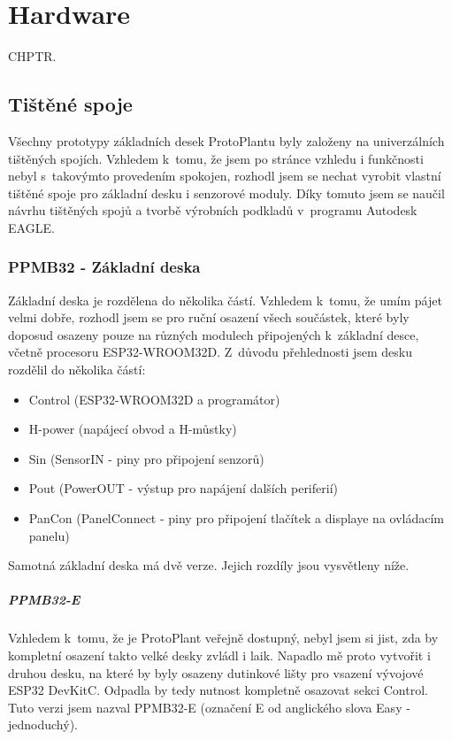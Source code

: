 \chapter{Hardware}
CHPTR.

\section{Tištěné spoje}
Všechny prototypy základních desek ProtoPlantu byly založeny na univerzálních tištěných spojích. Vzhledem k~tomu, že jsem po stránce vzhledu i funkčnosti nebyl s~takovýmto provedením spokojen, rozhodl jsem se nechat vyrobit vlastní tištěné spoje pro základní desku i senzorové moduly.
Díky tomuto jsem se naučil návrhu tištěných spojů a tvorbě výrobních podkladů v~programu Autodesk EAGLE.

\subsection{PPMB32 - Základní deska}
Základní deska je rozdělena do několika částí. 
Vzhledem k~tomu, že umím pájet velmi dobře, rozhodl jsem se pro ruční osazení všech součástek, které byly doposud osazeny pouze na různých modulech připojených k~základní desce, včetně procesoru ESP32-WROOM32D.
Z~důvodu přehlednosti jsem desku rozdělil do několika částí:

\begin{itemize}
    \item Control (ESP32-WROOM32D a programátor)
    \item H-power (napájecí obvod a H-můstky)
    \item Sin (SensorIN - piny pro připojení senzorů)
    \item Pout (PowerOUT - výstup pro napájení dalších periferií)
    \item PanCon (PanelConnect - piny pro připojení tlačítek a displaye na ovládacím panelu)
\end{itemize} 

Samotná základní deska má dvě verze. Jejich rozdíly jsou vysvětleny níže.

\paragraph{PPMB32-E}
Vzhledem k~tomu, že je ProtoPlant veřejně dostupný, nebyl jsem si jist, zda by kompletní osazení takto velké desky zvládl i laik. 
Napadlo mě proto vytvořit i druhou desku, na které by byly osazeny dutinkové lišty pro vsazení vývojové ESP32 DevKitC. 
Odpadla by tedy nutnost kompletně osazovat sekci Control. 
Tuto verzi jsem nazval PPMB32-E (označení E od anglického slova Easy - jednoduchý).

